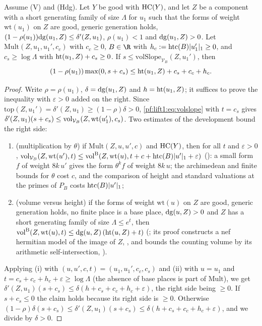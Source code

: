 \begin{lemma}\label{pf:lift1:slopeht}
Assume (V) and (Hdg). Let $Y$ be good with $\mathrm{HC}(Y)$, and let $Z$ be a component with a short
generating family of size $\Lambda$ for $u_1$ such that the forms of weight $\mathrm{wt}(u_1)$ on $Z$ are
good, generic generation holds, $(1-\rho(u_1))\mathrm{dg}(u_1,Z)\le\delta'(Z,u_1)$, $\rho(u_1)<1$ and
$\mathrm{dg}(u_1,Z)>0$. Let $\mathrm{Mult}(Z,u_1,u_1',c_c)$ with $c_c\ge0$, $B\in\R$ with
$h_c:=\mathrm{htc}(B)|u_1'|_1\ge0$, and $c_s\ge\log\Lambda$ with $\mathrm{ht}(u_1,Z)+c_s\ge0$. If
$s\le\mathrm{volSlope}_{\mathcal V_B}(Z,u_1')$, then
\[
(1-\rho(u_1))\max(0,s+c_s)\le\mathrm{ht}(u_1,Z)+c_s+c_c+h_c.
\]
\end{lemma}

\begin{proof}
Write $\rho=\rho(u_1)$, $\delta=\mathrm{dg}(u_1,Z)$ and $h=\mathrm{ht}(u_1,Z)$; it suffices to prove the
inequality with $\varepsilon>0$ added on the right. Since $\mathrm{top}(Z,u_1')=\delta'(Z,u_1)\ge
(1-\rho)\delta>0$, \eqref{pf:lift1:eq:volslope} with $t=c_s$ gives
$\delta'(Z,u_1)(s+c_s)\le\mathrm{vol}_{\mathcal V_B}(Z,\mathrm{wt}(u_1'),c_s)$. Two estimates of the
development bound the right side:
\begin{enumerate}[label=(\roman*)]
\item (multiplication by $\theta$) if $\mathrm{Mult}(Z,u,u',c)$ and $\mathrm{HC}(Y)$, then for all
  $t$ and $\varepsilon>0$,
  $\mathrm{vol}_{\mathcal V_B}(Z,\mathrm{wt}(u'),t)\le\mathrm{vol}^{\mathrm B}(Z,\mathrm{wt}(u),t+c+\mathrm{htc}(B)|u'|_1+\varepsilon)$
  (): a small form $f$ of weight $8k\,u'$ gives the form
  $\theta^kf$ of weight $8k\,u$; the archimedean and finite bounds for $\theta$ cost $c$, and the
  comparison of height and standard valuations at the primes of $P_B$ costs
  $\mathrm{htc}(B)|u'|_1$;
\item (volume versus height) if the forms of weight $\mathrm{wt}(u)$ on $Z$ are good, generic generation
  holds, no finite place is a base place, $\mathrm{dg}(u,Z)>0$ and $Z$ has a short generating family of
  size $\Lambda\le e^t$, then
  $\mathrm{vol}^{\mathrm B}(Z,\mathrm{wt}(u),t)\le\mathrm{dg}(u,Z)\,(\mathrm{ht}(u,Z)+t)$
  (; its proof constructs a nef
  hermitian model of the image of $Z$,
  , and bounds the
  counting volume by its arithmetic self-intersection,
  ).
\end{enumerate}
Applying (i) with $(u,u',c,t)=(u_1,u_1',c_c,c_s)$ and (ii) with $u=u_1$ and
$t=c_s+c_c+h_c+\varepsilon\ge\log\Lambda$ (the absence of base places is part of $\mathrm{Mult}$), we get
$\delta'(Z,u_1)(s+c_s)\le\delta(h+c_s+c_c+h_c+\varepsilon)$, the right side being $\ge0$. If $s+c_s\le0$
the claim holds because its right side is $\ge0$. Otherwise
$(1-\rho)\delta(s+c_s)\le\delta'(Z,u_1)(s+c_s)\le\delta(h+c_s+c_c+h_c+\varepsilon)$, and we divide by
$\delta>0$.
\end{proof}

